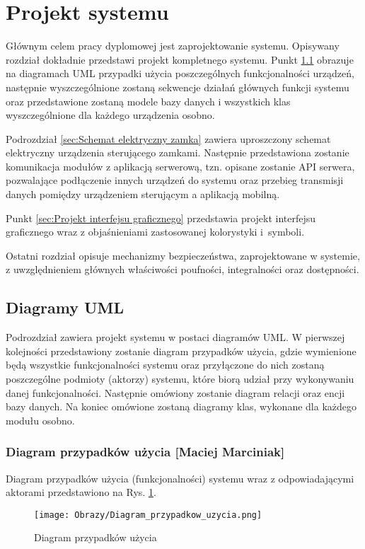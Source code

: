 % 
\newpage\section{Projekt systemu \textsl{\NazwaSys}}\label{sec:projekt}
Głównym celem pracy dyplomowej jest zaprojektowanie systemu. Opisywany rozdział dokładnie przedstawi projekt kompletnego systemu. Punkt \ref {sec:Diagramy UML} obrazuje na diagramach UML przypadki użycia poszczególnych funkcjonalności urządzeń, następnie wyszczególnione zostaną sekwencje działań głównych funkcji systemu oraz przedstawione zostaną modele bazy danych i wszystkich klas wyszczególnione dla każdego urządzenia osobno. 

Podrozdział \ref {sec:Schemat elektryczny zamka} zawiera uproszczony schemat elektryczny urządzenia sterującego zamkami. Następnie przedstawiona zostanie komunikacja modułów z aplikacją serwerową, tzn. opisane zostanie API serwera, pozwalające podłączenie innych urządzeń do systemu oraz przebieg transmisji danych pomiędzy urządzeniem sterującym a aplikacją mobilną.

Punkt \ref{sec:Projekt interfejsu graficznego} przedstawia projekt interfejsu graficznego wraz z objaśnieniami zastosowanej kolorystyki i~symboli.

Ostatni rozdział opisuje mechanizmy bezpieczeństwa, zaprojektowane w systemie, z uwzględnieniem głównych właściwości poufności, integralności oraz dostępności.

\subsection{Diagramy UML}\label{sec:Diagramy UML}
Podrozdział zawiera projekt systemu w postaci diagramów UML. W pierwszej kolejności przedstawiony zostanie diagram przypadków użycia, gdzie wymienione będą wszystkie funkcjonalności systemu oraz przyłączone do nich zostaną poszczególne podmioty (aktorzy) systemu, które biorą udział przy wykonywaniu danej funkcjonalności. Następnie omówiony zostanie diagram relacji oraz encji bazy danych. Na koniec omówione zostaną diagramy klas, wykonane dla każdego modułu osobno. 
\subsubsection{Diagram przypadków użycia [Maciej Marciniak]}
Diagram przypadków użycia (funkcjonalności) systemu wraz z odpowiadającymi aktorami przedstawiono na Rys. \ref{diagram:diagram przypadków_użycia}.
\begin{landscape}
	\begin{figure}[!h]
		\centering
		\texttt{[image: Obrazy/Diagram\_przypadkow\_uzycia.png]}
		\caption{Diagram przypadków użycia}
		\label{diagram:diagram przypadków_użycia}
	\end{figure}
\end{landscape}
\newpage
